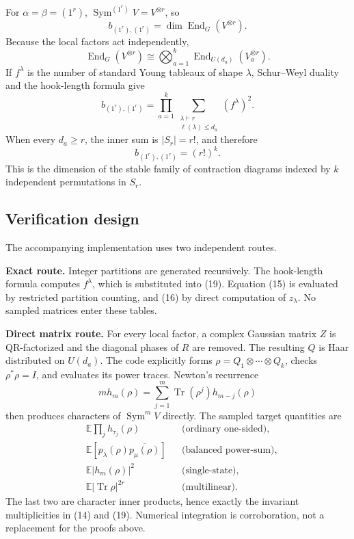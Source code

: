 \documentclass[10pt]{article}
\newcommand{\Sym}{\operatorname{Sym}}
\newcommand{\Tr}{\operatorname{Tr}}
\newcommand{\End}{\operatorname{End}}
\begin{document}
For $\alpha=\beta=(1^r)$, $\Sym^{(1^r)}V=V^{\otimes r}$, so
\begin{equation}
 b_{(1^r),(1^r)}=\dim\End_G(V^{\otimes r}).
\end{equation}
Because the local factors act independently,
\[
 \End_G(V^{\otimes r})\cong
 \bigotimes_{a=1}^k\End_{U(d_a)}(V_a^{\otimes r}).
\]
If $f^\lambda$ is the number of standard Young tableaux of shape $\lambda$,
Schur--Weyl duality and the hook-length formula give
\begin{equation}
 \boxed{b_{(1^r),(1^r)}=
 \prod_{a=1}^k\sum_{\substack{\lambda\vdash r\\
                    \ell(\lambda)\le d_a}}(f^\lambda)^2.}
\end{equation}
When every $d_a\ge r$, the inner sum is $|S_r|=r!$, and therefore
\begin{equation}
 \boxed{b_{(1^r),(1^r)}=(r!)^k.}
\end{equation}
This is the dimension of the stable family of contraction diagrams indexed by
$k$ independent permutations in $S_r$.

\subsection{Verification design}

The accompanying implementation uses two independent routes.

\textbf{Exact route.}
Integer partitions are generated recursively. The hook-length formula computes
$f^\lambda$, which is substituted into (19). Equation (15) is evaluated by
restricted partition counting, and (16) by direct computation of $z_\lambda$.
No sampled matrices enter these tables.

\textbf{Direct matrix route.}
For every local factor, a complex Gaussian matrix $Z$ is QR-factorized and the
diagonal phases of $R$ are removed. The resulting $Q$ is Haar distributed on
$U(d_a)$. The code explicitly forms
$\rho=Q_1\otimes\cdots\otimes Q_k$, checks $\rho^*\rho=I$, and evaluates its
power traces. Newton's recurrence
\begin{equation}
 mh_m(\rho)=\sum_{j=1}^m\Tr(\rho^j)h_{m-j}(\rho)
\end{equation}
then produces characters of $\Sym^mV$ directly. The sampled target quantities
are
\begin{align*}
 &\mathbb E\prod_jh_{\tau_j}(\rho) &&\text{(ordinary one-sided)},\\
 &\mathbb E[p_\lambda(\rho)\overline{p_\mu(\rho)}]
     &&\text{(balanced power-sum)},\\
 &\mathbb E|h_m(\rho)|^2 &&\text{(single-state)},\\
 &\mathbb E|\Tr\rho|^{2r} &&\text{(multilinear)}.
\end{align*}
The last two are character inner products, hence exactly the invariant
multiplicities in (14) and (19). Numerical integration is corroboration, not a
replacement for the proofs above.
\end{document}
